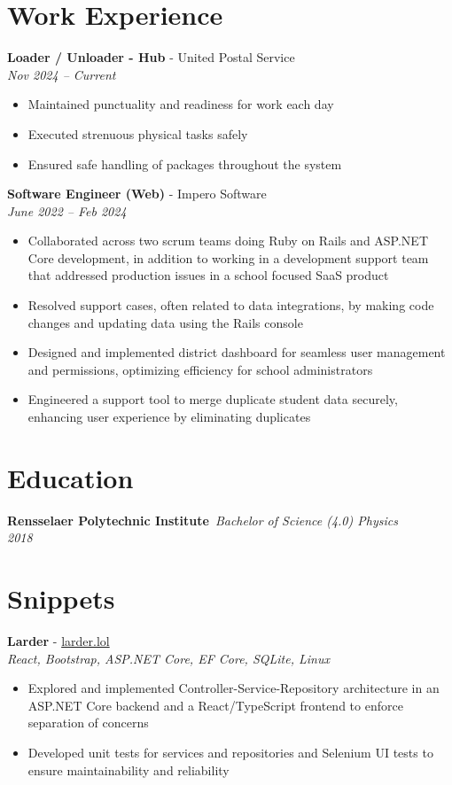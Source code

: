\documentclass[a4paper,10pt]{article}
\begin{document}
\begin{flushleft}

\section*{Work Experience}
\textbf{Loader / Unloader - Hub} - United Postal Service\\
\textit{Nov 2024 – Current}
\begin{itemize}
    \item Maintained punctuality and readiness for work each day
    \item Executed strenuous physical tasks safely
    \item Ensured safe handling of packages throughout the system
\end{itemize}

\textbf{Software Engineer (Web)} - Impero Software\\
\textit{June 2022 – Feb 2024}
\begin{itemize}
    \item Collaborated across two scrum teams doing Ruby on Rails and ASP.NET Core development, in
 addition to working in a development support team that addressed production issues in a school
focused SaaS product
     \item Resolved support cases, often related to data integrations, by making code changes and updating
 data using the Rails console
    \item Designed and implemented district dashboard for seamless user management and permissions, optimizing efficiency for school administrators
    \item Engineered a support tool to merge duplicate student data securely, enhancing user experience by eliminating duplicates
    
\end{itemize}

\section*{Education}
\textbf{Rensselaer Polytechnic Institute}\
\textit{Bachelor of Science (4.0) Physics}\\
\textit{2018}

\section*{Snippets}

\textbf{Larder} - \href{https://larder.lol}{larder.lol}\\
\textit{React, Bootstrap, ASP.NET Core, EF Core, SQLite, Linux}\\
\begin{itemize}
    \item Explored and implemented Controller-Service-Repository architecture in an ASP.NET Core backend and a React/TypeScript frontend to enforce separation of concerns
    \item Developed unit tests for services and repositories and Selenium UI tests to ensure maintainability and reliability
 

\end{itemize}
\end{flushleft}
\end{document}
